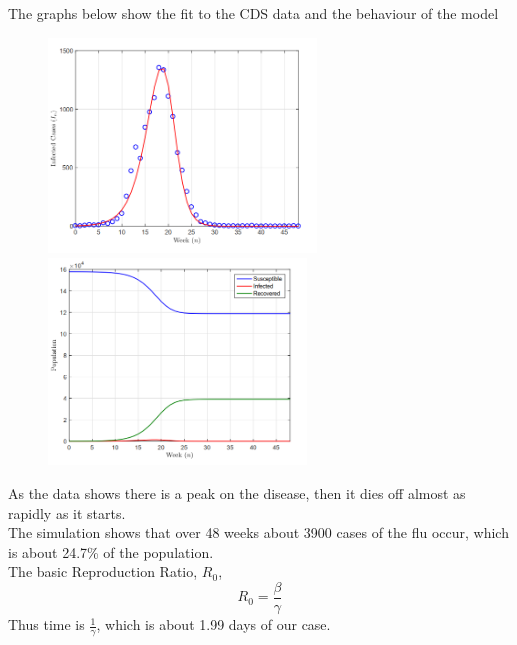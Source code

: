 \documentclass[12pt]{report}
\newcommand{\sps}{\\[0.2cm]}
\newcommand{\NI}{\noindent}
\newcommand{\dsp}{\displaystyle}
\begin{document}
	\NI The graphs below show the fit to the CDS data and the behaviour of the model\\	
	\begin{center}
		\begin{figure}[!hbt]
			\begin{minipage}[c]{0.5\linewidth}
				\includegraphics[width=2.8in]{s_m1}
			\end{minipage}
			\begin{minipage}[c]{0.5\linewidth}
				\includegraphics[width=2.7in]{s_m2}
			\end{minipage}
		\end{figure}
	\end{center}
	\NI As the data shows there is a peak on the disease, then it dies off almost as rapidly as it starts.\sps
	The simulation shows that over 48 weeks about 3900 cases of the flu occur, which is about 24.7\% of the population.\sps
	The basic Reproduction Ratio, $R_0$,\\
	\begin{equation*}
		R_0 = \frac{\beta}{\gamma}
	\end{equation*}
	Thus time is $\dsp \frac{1}{\gamma}$, which is about 1.99 days of our case.
	
\end{document}

